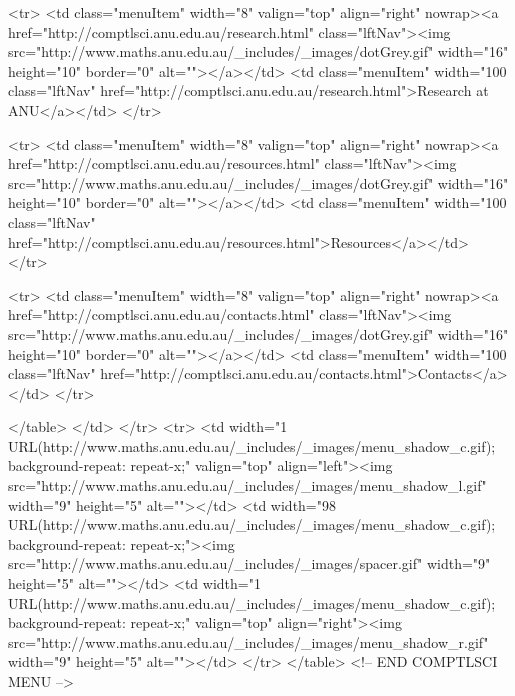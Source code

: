 \begin{html}
  <tr>
    <td class="menuItem" width="8"
    valign="top" align="right" nowrap><a
    href="http://comptlsci.anu.edu.au/research.html"
    class="lftNav"><img src="http://www.maths.anu.edu.au/_includes/_images/dotGrey.gif" width="16"
    height="10" border="0" alt=""></a></td>
    <td class="menuItem" width="100%
    class="lftNav"
    href="http://comptlsci.anu.edu.au/research.html">Research at ANU</a></td>
  </tr>

  <tr>
    <td class="menuItem" width="8"
    valign="top" align="right" nowrap><a
    href="http://comptlsci.anu.edu.au/resources.html"
    class="lftNav"><img src="http://www.maths.anu.edu.au/_includes/_images/dotGrey.gif" width="16"
    height="10" border="0" alt=""></a></td>
    <td class="menuItem" width="100%
    class="lftNav"
    href="http://comptlsci.anu.edu.au/resources.html">Resources</a></td>
  </tr>


  <tr>
    <td class="menuItem" width="8"
    valign="top" align="right" nowrap><a
    href="http://comptlsci.anu.edu.au/contacts.html"
    class="lftNav"><img src="http://www.maths.anu.edu.au/_includes/_images/dotGrey.gif" width="16"
    height="10" border="0" alt=""></a></td>
    <td class="menuItem" width="100%
    class="lftNav"
    href="http://comptlsci.anu.edu.au/contacts.html">Contacts</a></td>
  </tr>






  </table>
  </td>
</tr>
<tr>
  <td width="1%
  URL(http://www.maths.anu.edu.au/_includes/_images/menu_shadow_c.gif); background-repeat: repeat-x;"
  valign="top" align="left"><img src="http://www.maths.anu.edu.au/_includes/_images/menu_shadow_l.gif"
  width="9" height="5" alt=""></td>
  <td width="98%
  URL(http://www.maths.anu.edu.au/_includes/_images/menu_shadow_c.gif); background-repeat:
  repeat-x;"><img src="http://www.maths.anu.edu.au/_includes/_images/spacer.gif" width="9" height="5"
  alt=""></td>
  <td width="1%
  URL(http://www.maths.anu.edu.au/_includes/_images/menu_shadow_c.gif); background-repeat: repeat-x;"
  valign="top" align="right"><img src="http://www.maths.anu.edu.au/_includes/_images/menu_shadow_r.gif"
  width="9" height="5" alt=""></td>
</tr>
</table>
<!-- END COMPTLSCI MENU -->



\end{html}
